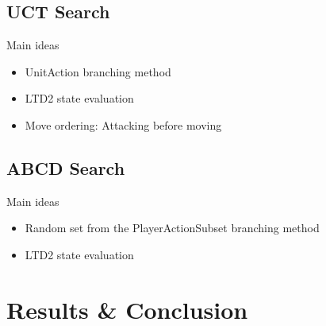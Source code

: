 \documentclass{beamer}
\newenvironment{framesec}{
    \begin{frame}{\secname}
}{\end{frame}}
\newenvironment{framesubsec}{
    \begin{frame}{\subsecname}
}{\end{frame}}
\begin{document}
\subsection{UCT Search}
\begin{framesubsec}
    \begin{block}{Main ideas}
        \begin{itemize}
            \item UnitAction branching method 
            \item LTD2 state evaluation
            \item Move ordering: Attacking before moving 
        \end{itemize}
    \end{block}
\end{framesubsec}

\subsection{ABCD Search}
\begin{framesubsec}
    \begin{block}{Main ideas}
        \begin{itemize}
            \item Random set from the PlayerActionSubset branching method 
            \item LTD2 state evaluation
        \end{itemize}
    \end{block}
\end{framesubsec}

\section{Results \& Conclusion}
\begin{framesec}
\end{framesec}
\end{document}
